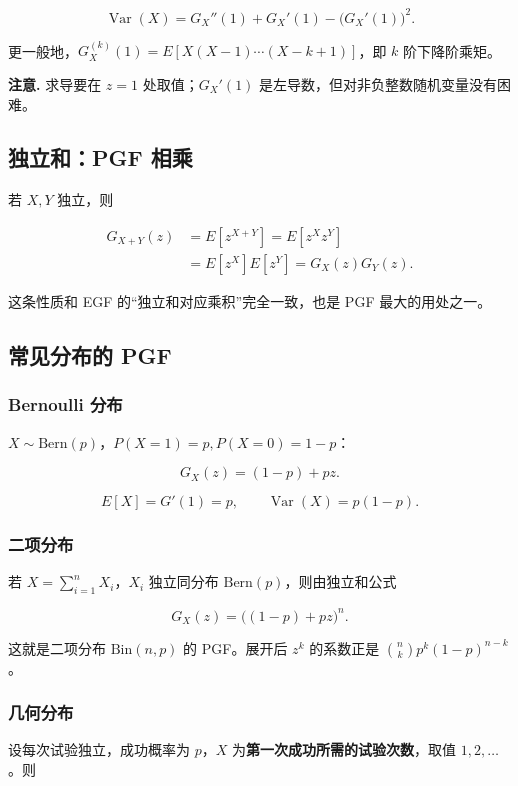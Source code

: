 \[
\boxed{
\operatorname{Var}(X)
=G_X''(1)+G_X'(1)-\bigl(G_X'(1)\bigr)^2
}.
\]

更一般地，$G_X^{(k)}(1)=E[X(X-1)\cdots(X-k+1)]$，即 $k$ 阶下降阶乘矩。

\textbf{注意.} 求导要在 $z=1$ 处取值；$G_X'(1)$ 是左导数，但对非负整数随机变量没有困难。

\subsection{独立和：PGF 相乘}


若 $X,Y$ 独立，则

\[
\begin{aligned}
G_{X+Y}(z)
&=E[z^{X+Y}]
=E[z^Xz^Y]\\
&=E[z^X]E[z^Y]
=G_X(z)G_Y(z).
\end{aligned}
\]

这条性质和 EGF 的“独立和对应乘积”完全一致，也是 PGF 最大的用处之一。

\subsection{常见分布的 PGF}


\subsubsection{Bernoulli 分布}


$X\sim\mathrm{Bern}(p)$，$P(X=1)=p,P(X=0)=1-p$：

\[
G_X(z)=(1-p)+pz.
\]

\[
E[X]=G'(1)=p,\qquad
\operatorname{Var}(X)=p(1-p).
\]

\subsubsection{二项分布}


若 $X=\sum_{i=1}^nX_i$，$X_i$ 独立同分布 $\mathrm{Bern}(p)$，则由独立和公式

\[
G_X(z)=\bigl((1-p)+pz\bigr)^n.
\]

这就是二项分布 $\mathrm{Bin}(n,p)$ 的 PGF。展开后 $z^k$ 的系数正是 $\binom nk p^k(1-p)^{n-k}$。

\subsubsection{几何分布}


设每次试验独立，成功概率为 $p$，$X$ 为\textbf{第一次成功所需的试验次数}，取值 $1,2,\dots$。则

